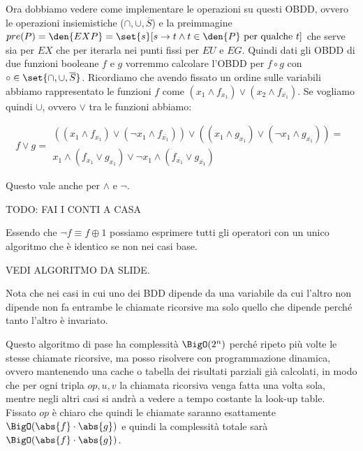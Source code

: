 Ora dobbiamo vedere come implementare le operazioni su questi OBDD, ovvero le operazioni insiemistiche (\(\cap, \cup, \overline{S}\)) e la preimmagine \(pre(P) = \den{EXP} = \set{s}[s\to t \land t \in \den{P} \text{ per qualche }t]\) che serve sia per \(EX\) che per iterarla nei punti fissi per \(EU\) e \(EG\). Quindi dati gli OBDD di due funzioni booleane \(f\) e \(g\) vorremmo calcolare l'OBDD per \(f \circ g\) con \(\circ \in \set{\cap, \cup, \overline{S}}\). Ricordiamo che avendo fissato un ordine sulle variabili abbiamo rappresentato le funzioni \(f\) come \((x_1 \land f_{x_1}) \lor (x_2 \land f_{\overline{x_1}})\). Se vogliamo quindi \(\cup\), ovvero \(\lor\) tra le funzioni abbiamo: 


\begin{equation*}
  f \lor g = \begin{aligned}
    ((x_1 \land f_{x_1}) \lor (\neg x_1 \land f_{\overline{x_1}})) \lor ((x_1 \land g_{x_1}) \lor (\neg x_1 \land g_{\overline{x_1}})) = \\
    x_1 \land (f_{x_1} \lor g_{x_1}) \lor \neg x_1 \land (f_{\overline{x_1}} \lor g_{\overline{x_1}})
    \end{aligned}
\end{equation*}

Questo vale anche per \(\land\) e \(\neg\). 

TODO: FAI I CONTI A CASA 

Essendo che \(\neg f \equiv f \oplus 1\) possiamo esprimere tutti gli operatori con un unico algoritmo che è identico se non nei casi base.

VEDI ALGORITMO DA SLIDE.

Nota che nei casi in cui uno dei BDD dipende da una variabile da cui l'altro non dipende non fa entrambe le chiamate ricorsive ma solo quello che dipende perché tanto l'altro è invariato.

Questo algoritmo di pase ha complessità \(\BigO(2^n)\) perché ripeto più volte le stesse chiamate ricorsive, ma posso risolvere con programmazione dinamica, ovvero mantenendo una cache o tabella dei risultati parziali già calcolati, in modo che per ogni tripla \(op,u,v\) la chiamata ricorsiva venga fatta una volta sola, mentre negli altri casi si andrà a vedere a tempo costante la look-up table. Fissato \(op\) è chiaro che quindi le chiamate saranno esattamente \(\BigO(\abs{f}\cdot \abs{g})\) e quindi la complessità totale sarà \(\BigO(\abs{f}\cdot \abs{g})\).

